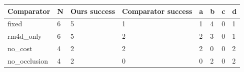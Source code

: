 \begin{tabular}{llllllll}
\hline
Comparator & N & Ours success & Comparator success & a & b & c & d \\
\hline
fixed & 6 & 5 & 1 & 1 & 4 & 0 & 1 \\
rm4d\_only & 6 & 5 & 2 & 2 & 3 & 0 & 1 \\
no\_cost & 4 & 2 & 2 & 2 & 0 & 0 & 2 \\
no\_occlusion & 4 & 2 & 0 & 0 & 2 & 0 & 2 \\
\hline
\end{tabular}
